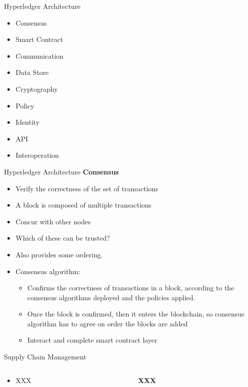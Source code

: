 \documentclass[pdf,table]{beamer}
\begin{document}
\begin{frame}{Hyperledger Architecture \cite{hyperledger:1}}
\begin{itemize}
	\item Consensus 
	\item Smart Contract 
	\item Communication
	\item Data Store
	\item Cryptography
	\item Policy
	\item Identity
	\item API
	\item Interoperation
\end{itemize}
\end{frame}

\begin{frame}{Hyperledger Architecture \cite{hyperledger:1}}
	{\bf Consensus}
\begin{itemize}
	\item Verify the correctness of the set of transactions
	\item A block is composed of multiple transactions
	\item Concur with other nodes
	\item Which of these can be trusted?
	\item Also provides some ordering.
	\item Consensus algorithm:
		\begin{itemize} \pause
			\item Confirms the correctness of transactions in a block, according to the consensus algorithms deployed and the policies applied.
			\item Once the block is confirmed, then it enters the blockchain, so consensus algorithm has to agree on order the blocks are added
			\item Interact and complete smart contract layer 
		\end{itemize}
\end{itemize}
\end{frame}

\begin{frame}{Supply Chain Management}
	\begin{columns}[T]
		\begin{column}{0.48\textwidth}
			\begin{itemize}
				\item XXX 
			\end{itemize}
		\end{column}
		\begin{column}{0.48\textwidth}
			{\bf XXX}
		\end{column}
	\end{columns}	
\end{frame}
\end{document}
